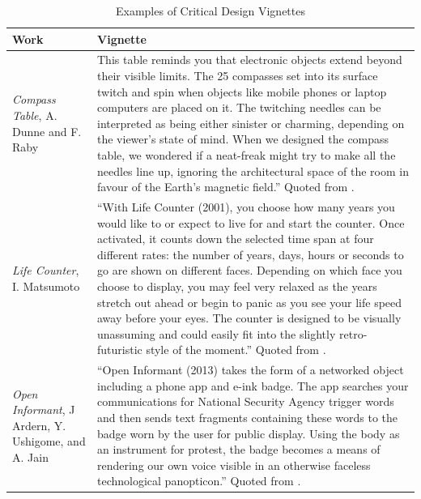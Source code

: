 
\begin{table}
\centering
\small
\caption{Examples of Critical Design Vignettes\label{tab:examples}}

\begin{tabular}{|p{3cm}|p{13cm}|} 
\hline

\textbf{Work} & \textbf{Vignette} \\ \hline


\textit{Compass Table}, \newline A. Dunne and F. Raby &
This table reminds you that electronic objects extend beyond their visible limits. The 25 compasses set into its surface twitch and spin when objects like mobile phones or laptop computers are placed on it. The twitching needles can be interpreted as being either sinister or charming, depending on the viewer's state of mind. When we designed the compass table, we wondered if a neat-freak might try to make all the needles line up, ignoring the architectural space of the room in favour of the Earth's magnetic field.'' Quoted from \cite{DuRa01}. \\ \hline

\textit{Life Counter}, \newline I. Matsumoto &
``With Life Counter (2001), you choose how many years you would like to or expect to live for and start the counter. Once activated, it counts down the selected time span at four different rates: the number of years, days, hours or seconds to go are shown on different faces. Depending on which face you choose to display, you may feel very relaxed as the years stretch out ahead or begin to panic as you see your life speed away before your eyes. The counter is designed to be visually unassuming and could easily fit into the slightly retro-futuristic style of the moment.'' Quoted from \cite{DuRa01}. \\ \hline

\textit{Open Informant}, \newline J Ardern,  Y. Ushigome, \newline and A. Jain &
``Open Informant (2013) takes the form of a networked object including a phone app and e-ink badge. The app searches your communications for National Security Agency trigger words and then sends text fragments containing these words to the badge worn by the user for public display. Using the body as an instrument for protest, the badge becomes a means of rendering our own voice visible in an otherwise faceless technological panopticon.'' Quoted from \cite{Mal17}. \\ \hline

\end{tabular}
\end{table}